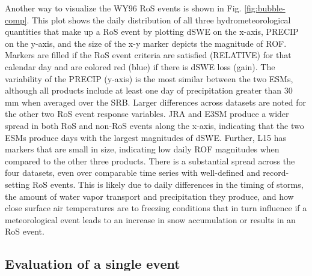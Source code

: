 \documentclass[nhess, manuscript]{copernicus}
\begin{document}
Another way to visualize the WY96 RoS events is shown in Fig. \ref{fig:bubble-comp}.
This plot shows the daily distribution of all three hydrometeorological quantities that make up a RoS event by plotting dSWE on the x-axis, PRECIP on the y-axis, and the size of the x-y marker depicts the magnitude of ROF.
Markers are filled if the RoS event criteria are satisfied (RELATIVE) for that calendar day and are colored red (blue) if there is dSWE loss (gain).
The variability of the PRECIP (y-axis) is the most similar between the two ESMs, although all products include at least one day of precipitation greater than 30 mm when averaged over the SRB.
Larger differences across datasets are noted for the other two RoS event response variables.
JRA and E3SM produce a wider spread in both RoS and non-RoS events along the x-axis, indicating that the two ESMs produce days with the largest magnitudes of dSWE.
Further, L15 has markers that are small in size, indicating low daily ROF magnitudes when compared to the other three products.
There is a substantial spread across the four datasets, even over comparable time series with well-defined and record-setting RoS events.
This is likely due to daily differences in the timing of storms, the amount of water vapor transport and precipitation they produce, and how close surface air temperatures are to freezing conditions that in turn influence if a meteorological event leads to an increase in snow accumulation or results in an RoS event.

\subsection{Evaluation of a single event}
\label{subsec:evaluationsingleevent}
\end{document}
